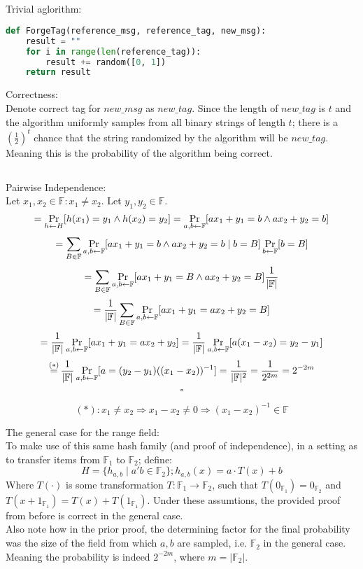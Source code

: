 \subsection{}
Trivial aglorithm:
\begin{lstlisting}[language=Python]
	def ForgeTag(reference_msg, reference_tag, new_msg):
	result = ""
	for i in range(len(reference_tag)):
		result += random([0, 1])
	return result
\end{lstlisting}

Correctness:\\
Denote correct tag for $new\_msg$ as $new\_tag$.
Since the length of $new\_tag$ is $t$ and the algorithm uniformly samples
from all binary strings of length $t$; there is a $(\frac{1}{2})^t$
chance that the string randomized by the algorithm will be $new\_tag$.
Meaning this is the probability of the algorithm being correct.

\subsection{}
Pairwise Independence:\\
Let $x_1,x_2\in\mathbb{F}: x_1\neq x_2$. Let $y_1,y_2\in\mathbb{F}$.\\
\[
	=\operatorname*{Pr}_{h\leftarrow H}[h(x_1)=y_1\wedge h(x_2)=y_2]
	=\operatorname*{Pr}_{a,b\leftarrow\mathbb{F}}[ax_1+y_1=b\wedge ax_2+y_2=b]\]\[
	=\sum_{B\in\mathbb{F}}\operatorname*{Pr}_{a,b\leftarrow\mathbb{F}} [ax_1+y_1=b\wedge ax_2+y_2=b\mid b=B]\operatorname*{Pr}_{b\leftarrow\mathbb{F}}[b=B]\]\[
	=\sum_{B\in\mathbb{F}}\operatorname*{Pr}_{a,b\leftarrow\mathbb{F}} [ax_1+y_1=B\wedge ax_2+y_2=B]\frac{1}{|\mathbb{F}|}\]\[
	=\frac{1}{|\mathbb{F}|}\sum_{B\in\mathbb{F}}\operatorname*{Pr}_{a,b\leftarrow\mathbb{F}} [ax_1+y_1=ax_2+y_2=B]\]\[
	=\frac{1}{|\mathbb{F}|}\operatorname*{Pr}_{a,b\leftarrow\mathbb{F}} [ax_1+y_1=ax_2+y_2]
	=\frac{1}{|\mathbb{F}|}\operatorname*{Pr}_{a,b\leftarrow\mathbb{F}} [a(x_1-x_2)=y_2-y_1]\]\[
	\operatorname*{=}^{(*)}\frac{1}{|\mathbb{F}|}\operatorname*{Pr}_{a,b\leftarrow\mathbb{F}} [a=(y_2-y_1)((x_1-x_2))^{-1}]
	=\frac{1}{|\mathbb{F}|^2}
	=\frac{1}{2^{2m}}
	=2^{-2m}
\]
\[\square\]

\[
	(*): x_1\neq x_2\Rightarrow x_1-x_2\neq 0\Rightarrow (x_1-x_2)^{-1}\in\mathbb{F}
\]

The general case for the range field:\\
To make use of this same hash family (and proof of independence), in a setting as to
transfer items from $\mathbb{F}_1$ to $\mathbb{F}_2$; define:
\[
	H=\{h_{a,b}\mid a'b\in\mathbb{F}_2\}; h_{a,b}(x)=a\cdot T(x)+b
\]
Where $T(\cdot)$ is some transformation $T:\mathbb{F}_1\longrightarrow \mathbb{F}_2$, such that
$T(0_{\mathbb{F}_1})=0_{\mathbb{F}_2}$ and $T(x+1_{\mathbb{F}_1})=T(x)+T(1_{\mathbb{F}_1})$.
Under these assumtions, the provided proof from before is correct in the general case.\\
Also note how in the prior proof, the determining factor for the final probability was
the size of the field from which $a,b$ are sampled, i.e. $\mathbb{F}_2$ in the 
general case. Meaning the probability is indeed $2^{-2m}$, where $m=|\mathbb{F}_2|$.

